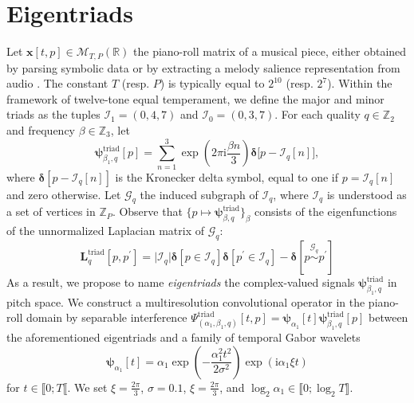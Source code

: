 \documentclass{article}
\makeatletter
\def\resp{resp.\@\xspace}
\makeatother
\begin{document}
\section{Eigentriads}\label{sec:eigentriads}
Let $\boldsymbol{x}[t,p]\in\mathcal{M}_{T,P}(\mathbb{R})$ the piano-roll matrix of a musical piece, either obtained by parsing symbolic data or by extracting a melody salience representation from audio \cite{bittner2017ismir}.
The constant $T$ (\resp{} $P$) is typically equal to $2^{10}$ (\resp{} $2^7$).
Within the framework of twelve-tone equal temperament, we define the major and minor triads as the tuples $\mathcal{I}_1 = (0, 4, 7)$ and $\mathcal{I}_0 =(0, 3, 7)$.
For each quality $q\in\mathbb{Z}_2$ and frequency $\beta \in \mathbb{Z}_3$, let
\begin{equation}
\boldsymbol{\psi}_{\beta_1,q}^{\mathrm{triad}}[p] = \sum_{n=1}^{3} \exp\left(2\pi \mathrm{i} \dfrac{\beta n}{3}\right) \boldsymbol{\delta}\big[p - \mathcal{I}_q[n]\big],
\end{equation}
where $\boldsymbol{\delta}[p-\mathcal{I}_q[n]]$ is the Kronecker delta symbol, equal to one if $p=\mathcal{I}_q [n]$ and zero otherwise.
Let $\mathcal{G}_q$ the induced subgraph of $\mathcal{I}_q$, where $\mathcal{I}_q$ is understood as a set of vertices in $\mathbb{Z}_P$.
Observe that $\{p \mapsto \boldsymbol{\psi}_{\beta,q}^{\mathrm{triad}}\}_\beta$ consists of the eigenfunctions of the unnormalized Laplacian
matrix of $\mathcal{G}_q$:
\begin{equation}
\mathbf{L}^{\mathrm{triad}}_q [p,p^\prime] = \vert \mathcal{I}_q \vert \boldsymbol{\delta}[p\in\mathcal{I}_q] \boldsymbol{\delta}[p^\prime \in\mathcal{I}_q] - \boldsymbol{\delta}[p \overset{\mathcal{G}_q}{\sim} p^\prime]
\end{equation}
As a result, we propose to name \emph{eigentriads} the complex-valued signals $\boldsymbol{\psi}_{\beta_1,q}^{\mathrm{triad}}$ in pitch space.
We construct a multiresolution convolutional operator in the piano-roll domain by separable interference
$\Psi_{(\alpha_1,\beta_1,q)}^{\mathrm{triad}}[t,p] = \boldsymbol{\psi}_{\alpha_1}[t] \boldsymbol{\psi}_{\beta_1,q}^{\mathrm{triad}}[p]$
between the aforementioned eigentriads and a family of temporal Gabor wavelets
\begin{equation}
\boldsymbol{\psi}_{\alpha_1}[t] =
\alpha_1 \exp\left(-\dfrac{\alpha_1^2 t^2}{2\sigma^2}\right) \exp(\mathrm{i}\alpha_1\xi t)
\end{equation}
for $t \in \llbracket 0; T \llbracket$.
We set $\xi = \frac{2\pi}{3}$, $\sigma=0.1$, $\xi=\frac{2\pi}{3}$, and $\log_2 \alpha_1 \in \llbracket 0; \log_2 T \rrbracket$.
\end{document}
